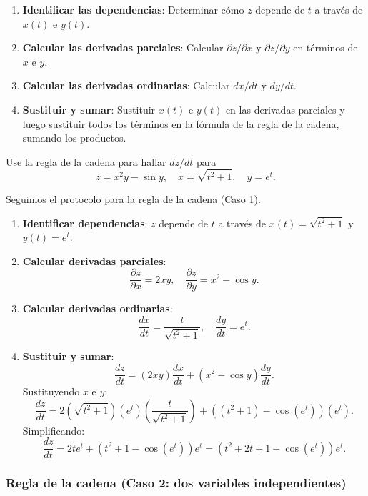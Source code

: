 \begin{pasos}
\begin{enumerate}
    \item \textbf{Identificar las dependencias}: Determinar cómo $z$ depende de $t$ a través de $x(t)$ e $y(t)$.
    \item \textbf{Calcular las derivadas parciales}: Calcular $\partial z/\partial x$ y $\partial z/\partial y$ en términos de $x$ e $y$.
    \item \textbf{Calcular las derivadas ordinarias}: Calcular $dx/dt$ y $dy/dt$.
    \item \textbf{Sustituir y sumar}: Sustituir $x(t)$ e $y(t)$ en las derivadas parciales y luego sustituir todos los términos en la fórmula de la regla de la cadena, sumando los productos.
\end{enumerate}
\end{pasos}

\begin{example}
Use la regla de la cadena para hallar $dz/dt$ para
\[
z = x^2 y - \sin y, \quad x = \sqrt{t^2 + 1}, \quad y = e^t.
\]
\end{example}
\begin{myproof}
Seguimos el protocolo para la regla de la cadena (Caso 1).
\begin{enumerate}
    \item \textbf{Identificar dependencias}: $z$ depende de $t$ a través de $x(t) = \sqrt{t^2+1}$ y $y(t) = e^t$.
    \item \textbf{Calcular derivadas parciales}:
    \[
    \frac{\partial z}{\partial x} = 2xy, \quad \frac{\partial z}{\partial y} = x^2 - \cos y.
    \]
    \item \textbf{Calcular derivadas ordinarias}:
    \[
    \frac{dx}{dt} = \frac{t}{\sqrt{t^2+1}}, \quad \frac{dy}{dt} = e^t.
    \]
    \item \textbf{Sustituir y sumar}:
    \[
    \frac{dz}{dt} = (2xy)\frac{dx}{dt} + (x^2 - \cos y)\frac{dy}{dt}.
    \]
    Sustituyendo $x$ e $y$:
    \[
    \frac{dz}{dt} = 2\left(\sqrt{t^2+1}\right)(e^t)\left(\frac{t}{\sqrt{t^2+1}}\right) + \left((t^2+1) - \cos(e^t)\right)(e^t).
    \]
    Simplificando:
    \[
    \frac{dz}{dt} = 2t e^t + \left(t^2 + 1 - \cos(e^t)\right)e^t = \boxed{\left(t^2 + 2t + 1 - \cos(e^t)\right)e^t}.
    \]
\end{enumerate}
\end{myproof}

\subsubsection{Regla de la cadena (Caso 2: dos variables independientes)}


